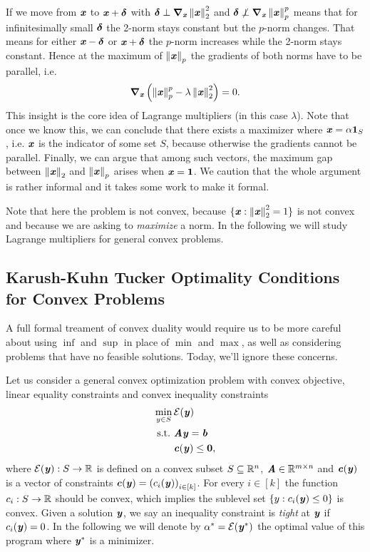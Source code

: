 If we move from $\boldsymbol{\mathit{x}}$ to $\boldsymbol{\mathit{x}} + \boldsymbol{\delta}$ with $\boldsymbol{\delta} \perp \boldsymbol{\nabla}_{\boldsymbol{\mathit{x}}}\left\| \boldsymbol{\mathit{x}} \right\|_2^2$ and $\boldsymbol{\delta} \not\perp \boldsymbol{\nabla}_{\boldsymbol{\mathit{x}}}\left\| \boldsymbol{\mathit{x}} \right\|_p^p$ means that for infinitesimally small $\boldsymbol{\delta}$ the 2-norm stays constant but the $p$-norm changes.
That means for either $\boldsymbol{\mathit{x}} - \boldsymbol{\delta}$ or $\boldsymbol{\mathit{x}} + \boldsymbol{\delta}$ the $p$-norm increases
while the 2-norm stays constant. Hence at the maximum of $\left\| \boldsymbol{\mathit{x}} \right\|_p$ the gradients of both norms have to be parallel, i.e.~\begin{equation*}\boldsymbol{\nabla}_{\boldsymbol{\mathit{x}}}\left(\left\| \boldsymbol{\mathit{x}} \right\|_p^p - \lambda\left\| \boldsymbol{\mathit{x}} \right\|_2^2\right) = 0.\end{equation*}
This insight is the core idea of Lagrange multipliers (in this case
$\lambda$).
Note that once we know this, we can conclude that there exists a
maximizer where $\boldsymbol{\mathit{x}} = \alpha \boldsymbol{1}_{S}$, i.e. $\boldsymbol{\mathit{x}}$ is the
indicator of some set $S$, because otherwise the gradients cannot be
parallel. Finally, we can argue that among such vectors, the maximum gap between
$\left\| \boldsymbol{\mathit{x}} \right\|_2$ and $\left\| \boldsymbol{\mathit{x}} \right\|_p$ arises when $\boldsymbol{\mathit{x}} = \boldsymbol{1}$.
We caution that the whole argument is rather informal and it takes
some work to make it formal.

Note that here the problem is not convex, because $\{ \boldsymbol{\mathit{x}}: \left\| \boldsymbol{\mathit{x}} \right\|_2^2 =
1 \}$ is not convex and because we are asking to \emph{maximize} a norm.
In the following we will study Lagrange multipliers for general convex
problems.

\subsection{Karush-Kuhn Tucker Optimality Conditions for Convex Problems}

A full formal treament of convex duality would require us to be more careful
about using $\inf$ and $\sup$ in place of $\min$ and $\max$, as well
as considering problems that have no feasible solutions.
Today, we'll ignore these concerns.

Let us consider a general convex optimization problem with convex objective, linear equality constraints and convex inequality constraints
\begin{align}
  \label{eq:primalprob}
     \min_{y \in S}{} & \mathcal{E}(\boldsymbol{\mathit{y}}) \\ \nonumber
\text{s.t.}\  & \boldsymbol{\mathit{A}}\boldsymbol{\mathit{y}} = \boldsymbol{\mathit{b}} \\ \nonumber
              & \boldsymbol{\mathit{c}}(\boldsymbol{\mathit{y}}) \leq \boldsymbol{0},
\end{align}
where $\mathcal{E}(\boldsymbol{\mathit{y}}): S \rightarrow \mathbb{R}$ is defined on a convex subset $S \subseteq \mathbb{R}^n$, $\boldsymbol{\mathit{A}} \in \mathbb{R}^{m\times n}$
and $\boldsymbol{\mathit{c}}(\boldsymbol{\mathit{y}})$ is a vector of constraints $\boldsymbol{\mathit{c}}(\boldsymbol{\mathit{y}}) = \left(c_i(\boldsymbol{\mathit{y}})\right)_{i \in [k]}$.
For every $i \in [k]$ the function $c_i: S \rightarrow \mathbb{R}$ should be convex,
which implies the sublevel set $\left\{y : c_i(\boldsymbol{\mathit{y}}) \leq 0  \right\}$ is
convex.
Given a solution $\boldsymbol{\mathit{y}}$, we say an inequality constraint is
\emph{tight} at $\boldsymbol{\mathit{y}}$ if $c_i(\boldsymbol{\mathit{y}}) = 0$.
In the following we will denote by $\alpha^* = \mathcal{E}(\boldsymbol{\mathit{y}}^*)$ the optimal value of this program where $\boldsymbol{\mathit{y}}^*$ is a minimizer.

